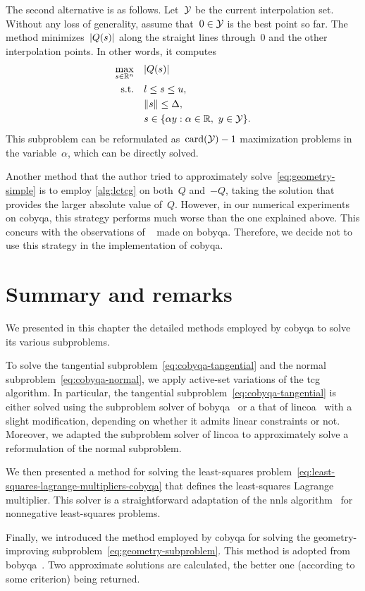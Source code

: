 The second alternative is as follows.
Let~$\xpt$ be the current interpolation set.
Without any loss of generality, assume that~$0 \in \xpt$ is the best point so far.
The method minimizes~$\abs{Q(\sstep)}$ along the straight lines through~$0$ and the other interpolation points.
In other words, it computes
\begin{align*}
    \max_{\sstep \in \R^n}  & \quad \abs{Q(\sstep)}\\
    \text{s.t.}             & \quad \xl \le \sstep \le \xu,\\
                            & \quad \norm{\sstep} \le \rad,\\
                            & \quad \sstep \in \set{\alpha y : \alpha \in \R, ~ y \in \xpt}.
\end{align*}
This subproblem can be reformulated as~$\card(\xpt) - 1$ maximization problems in the variable~$\alpha$, which can be directly solved.

Another method that the author tried to approximately solve~\cref{eq:geometry-simple} is to employ \cref{alg:lctcg} on both~$Q$ and~$-Q$, taking the solution that provides the larger absolute value of~$Q$.
However, in our numerical experiments on \gls{cobyqa}, this strategy performs much worse than the one explained above.
This concurs with the observations of \citeauthor{Powell_2008}~\cite{Powell_2008} made on \gls{bobyqa}.
Therefore, we decide not to use this strategy in the implementation of \gls{cobyqa}.

\section{Summary and remarks}

We presented in this chapter the detailed methods employed by \gls{cobyqa} to solve its various subproblems.

To solve the tangential subproblem~\cref{eq:cobyqa-tangential} and the normal subproblem~\cref{eq:cobyqa-normal}, we apply active-set variations of the \gls{tcg} algorithm.
In particular, the tangential subproblem~\cref{eq:cobyqa-tangential} is either solved using the subproblem solver of \gls{bobyqa}~\cite{Powell_2009} or a that of \gls{lincoa}~\cite{Powell_2015} with a slight modification, depending on whether it admits linear constraints or not.
Moreover, we adapted the subproblem solver of \gls{lincoa} to approximately solve a reformulation of the normal subproblem.

We then presented a method for solving the least-squares problem~\cref{eq:least-squares-lagrange-multipliers-cobyqa} that defines the least-squares Lagrange multiplier.
This solver is a straightforward adaptation of the \gls{nnls} algorithm~\cite[Alg.~23.10]{Lawson_Hanson_1987} for nonnegative least-squares problems.

Finally, we introduced the method employed by \gls{cobyqa} for solving the geometry-improving subproblem~\cref{eq:geometry-subproblem}.
This method is adopted from \gls{bobyqa}~\cite{Powell_2009}.
Two approximate solutions are calculated, the better one (according to some criterion) being returned.
